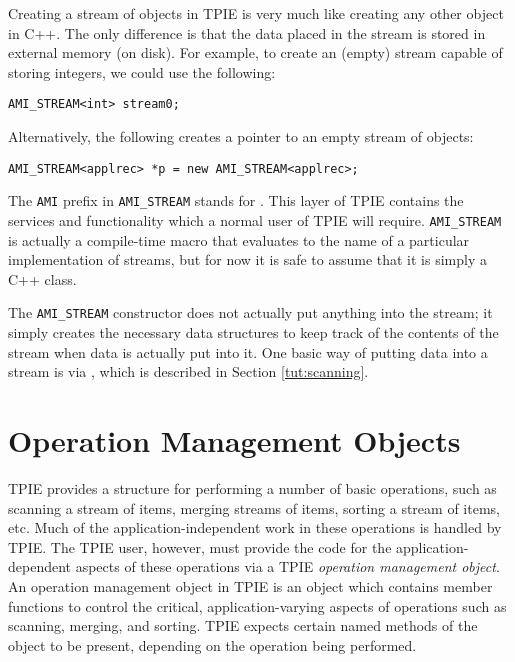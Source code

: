 Creating a stream of objects in TPIE is very much like
creating any other object in C++. The only difference is
that the data placed in the stream is stored in external
memory (on disk). 
For example, to create an (empty) stream 
capable of storing integers, we could use the following:
\begin{verbatim}
AMI_STREAM<int> stream0;
\end{verbatim}
Alternatively, the following creates a pointer
 to an empty stream of  objects:
\begin{verbatim}
AMI_STREAM<applrec> *p = new AMI_STREAM<applrec>;
\end{verbatim}

The {\tt AMI} prefix in {\tt AMI\_STREAM} stands for
. This layer of TPIE contains the
services and functionality which a normal user of TPIE will
require.  {\tt AMI\_STREAM} is actually a compile-time macro
that evaluates to the name of a particular implementation of
streams, but for now it is safe to assume that it is simply
a C++ class.

The {\tt AMI\_STREAM} constructor does not actually put
anything into the stream; it simply creates the necessary
data structures to keep track of the contents of the stream
when data is actually put into it.  One basic way of putting
data into a stream is via , which is
described in Section \ref{tut:scanning}.

\section{Operation Management Objects} 

TPIE provides a structure for performing a number of basic
operations, such as scanning a stream of items, merging
streams of items, sorting a stream of items, etc. Much of
the application-independent work in these operations is
handled by TPIE. The TPIE user, however, must provide the
code for the application-dependent aspects of these
operations via a TPIE {\em operation management object}. An
operation management object in TPIE is an object which
contains member functions to control the critical,
application-varying aspects of operations such as scanning,
merging, and sorting. TPIE expects certain named methods of
the object to be present, depending on the operation being
performed. 

